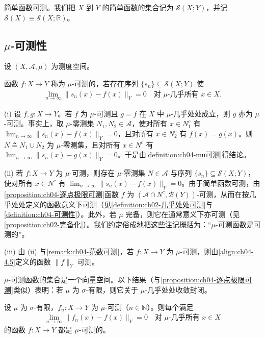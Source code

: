 \documentclass[../../main.tex]{subfiles}%
\begin{document}
简单函数可测。我们把 $X$ 到 $Y$ 的简单函数的集合记为 $\mathcal{S}(X;Y)$，并记 $\mathcal{S}(X)\equiv\mathcal{S}(X;\mathbb{R})$。

\subsection{$\mu$-可测性}\label{subsection:ch04-mu可测性}

设 $(X,\mathcal{A},\mu)$ 为测度空间。

\begin{definition}[$\mu$-可测性]\label{definition:ch04-mu可测}
函数 $f:X\to Y$ 称为 $\mu$-可测的，若存在序列 $\{s_n\}\subseteq\mathcal{S}(X;Y)$ 使
\begin{align}
\lim_{n\to\infty}\|s_n(x)-f(x)\|_Y=0\quad\text{对 }\mu\text{-几乎所有 }x\in X. \label{align:ch04-4.6}
\end{align}
\end{definition}

\begin{remark}\label{remark:ch04-mu可测注}
(i) 设 $f,g:X\to Y$。若 $f$ 为 $\mu$-可测且 $g=f$ 在 $X$ 中 $\mu$-几乎处处成立，则 $g$ 亦为 $\mu$-可测。事实上，取 $\mu$-零测集 $N_1,N_2\in\mathcal{A}$，使对所有 $x\in N_1^c$ 有 $\lim_{n\to\infty}\|s_n(x)-f(x)\|_Y=0$，且对所有 $x\in N_2^c$ 有 $f(x)=g(x)$。则 $N\triangleq N_1\cup N_2$ 为 $\mu$-零测集，且对所有 $x\in N^c$ 有 $\lim_{n\to\infty}\|s_n(x)-g(x)\|_Y=0$。于是由\cref{definition:ch04-mu可测}得结论。

(ii) 若 $f:X\to Y$ 为 $\mu$-可测，则存在 $\mu$-零测集 $N\in\mathcal{A}$ 与序列 $\{s_n\}\subseteq\mathcal{S}(X;Y)$，使对所有 $x\in N^c$ 有 $\lim_{n\to\infty}\|s_n(x)-f(x)\|_Y=0$。由于简单函数可测，由\cref{proposition:ch04-逐点极限可测}函数 $f$ 为 $(\mathcal{A}\cap N^c,\mathcal{B}(Y))$-可测，从而在按几乎处处定义的函数意义下可测（见\cref{definition:ch02-几乎处处可测}与\cref{definition:ch04-可测性}）。此外，若 $\mu$ 完备，则它在通常意义下亦可测（见\cref{proposition:ch02-完备化}）。我们约定俗成地把这些注记概括为：“$\mu$-可测函数是可测的”。

(iii) 由 (ii) 与\cref{remark:ch04-范数可测}，若 $f:X\to Y$ 为 $\mu$-可测，则由\eqref{align:ch04-4.5}定义的函数 $\|f\|_Y$ 可测。
\end{remark}

$\mu$-可测函数的集合是一个向量空间。以下结果（与\cref{proposition:ch04-逐点极限可测}类似）表明：若 $\mu$ 为 $\sigma$-有限，则它关于 $\mu$-几乎处处收敛封闭。

\begin{proposition}\label{proposition:ch04-mu逐点极限}
设 $\mu$ 为 $\sigma$-有限，$f_n:X\to Y$ 为 $\mu$-可测（$n\in\mathbb{N}$）。则每个满足
\begin{align*}
\lim_{n\to\infty}\|f_n(x)-f(x)\|_Y=0\quad\text{对 }\mu\text{-几乎所有 }x\in X
\end{align*}
的函数 $f:X\to Y$ 都是 $\mu$-可测的。
\end{proposition}
\end{document}
